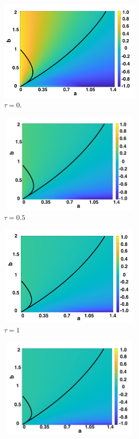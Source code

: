 \begin{figure}[H]
    \centering
    \begin{subfigure}[b]{0.45\textwidth}
        \centering
        \includegraphics[width=7cm,height=5cm]{tau0bif.png}
        \caption{$\tau=0$.}
        \label{}
    \end{subfigure}
    \hfill
    \begin{subfigure}[b]{0.45\textwidth}
        \centering
        \includegraphics[width=7cm,height=5cm]{tau05bif.png}
        \caption{$\tau=0.5$}
        \label{}
    \end{subfigure}
    \hfill
    \begin{subfigure}[b]{0.45\textwidth}
        \centering
        \includegraphics[width=7cm,height=5cm]{tau1bif.png}
        \caption{$\tau=1$}
        \label{}
    \end{subfigure}
    \hfill
    \begin{subfigure}[b]{0.45\textwidth}
        \centering
        \includegraphics[width=7cm,height=5cm]{tau15bif.png}

\end{subfigure}
\end{figure}
